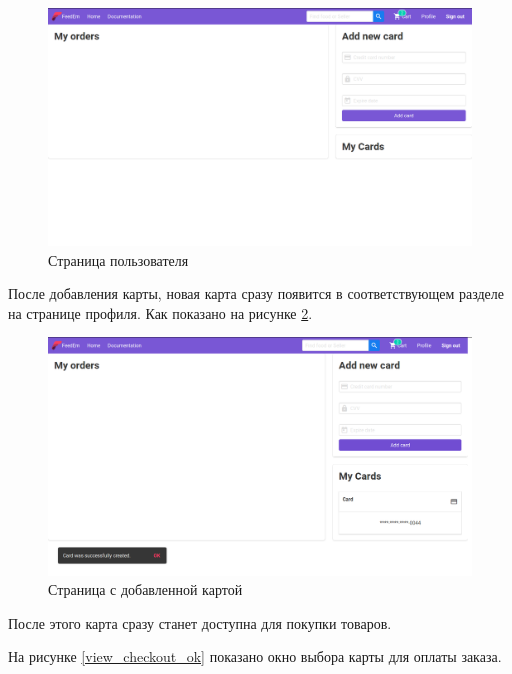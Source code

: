 {  \begin{figure}[H]
    \centering
    \includegraphics[width=\textwidth]{profile_empty.png}
    \caption{Страница пользователя}
    \label{view_user_empty}
  \end{figure}

  После добавления карты, новая карта сразу появится в
  соответствующем разделе на странице профиля. Как показано на рисунке \ref{view_profile_new_card}.

  \begin{figure}[H]
    \centering
    \includegraphics[width=\textwidth]{profile_card.png}
    \caption{Страница с добавленной картой}
    \label{view_profile_new_card}
  \end{figure}

  После этого карта сразу станет доступна для покупки товаров.

  На рисунке \ref{view_checkout_ok} показано окно выбора карты для оплаты заказа.

}
